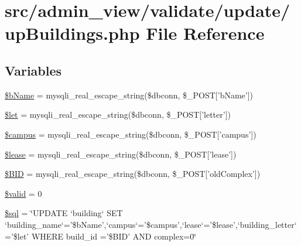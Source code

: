 \hypertarget{upBuildings_8php}{\section{src/admin\-\_\-view/validate/update/up\-Buildings.php \-File \-Reference}
\label{upBuildings_8php}
}
\subsection*{\-Variables}
\begin{DoxyCompactItemize}
\item 
\hyperlink{upBuildings_8php_adda32c78f7f7aed9a0f7bb03a9198e9c}{\$b\-Name} = mysqli\-\_\-real\-\_\-escape\-\_\-string(\$dbconn, \$\-\_\-\-P\-O\-S\-T\mbox{[}'b\-Name'\mbox{]})
\item 
\hyperlink{upBuildings_8php_ac3687b5a21519c53f240b5d1c07f997a}{\$let} = mysqli\-\_\-real\-\_\-escape\-\_\-string(\$dbconn, \$\-\_\-\-P\-O\-S\-T\mbox{[}'letter'\mbox{]})
\item 
\hyperlink{upBuildings_8php_a6f0655994f3941d6ab50f681032f899b}{\$campus} = mysqli\-\_\-real\-\_\-escape\-\_\-string(\$dbconn, \$\-\_\-\-P\-O\-S\-T\mbox{[}'campus'\mbox{]})
\item 
\hyperlink{upBuildings_8php_ae95126b1133cf958aaf8a31b0283364c}{\$lease} = mysqli\-\_\-real\-\_\-escape\-\_\-string(\$dbconn, \$\-\_\-\-P\-O\-S\-T\mbox{[}'lease'\mbox{]})
\item 
\hyperlink{upBuildings_8php_a7458cf5c1cfaeb93fe055362ecff999e}{\$\-B\-I\-D} = mysqli\-\_\-real\-\_\-escape\-\_\-string(\$dbconn, \$\-\_\-\-P\-O\-S\-T\mbox{[}'old\-Complex'\mbox{]})
\item 
\hyperlink{upBuildings_8php_a0587674d27d00ef497e08e53ccf45bbb}{\$valid} = 0
\item 
\hyperlink{upBuildings_8php_a047170d6020a882807665812a27e2525}{\$sql} = \char`\"{}\-U\-P\-D\-A\-T\-E `building` \-S\-E\-T `building\-\_\-name`='\$b\-Name',`campus`='\$campus',`lease`='\$lease',`building\-\_\-letter`='\$let' \-W\-H\-E\-R\-E build\-\_\-id ='\$\-B\-I\-D' \-A\-N\-D complex=0\char`\"{}
\end{DoxyCompactItemize}


